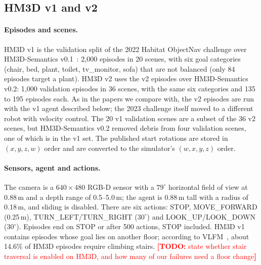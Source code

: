 \documentclass[10pt]{article}
\newcommand{\TODO}[1]{\textcolor{red}{\textbf{[TODO:} #1\textbf{]}}}
\begin{document}
\subsection{HM3D v1 and v2}\label{app:protocols-hm3d}

\paragraph{Episodes and scenes.} HM3D v1 is the validation split of the 2022 Habitat ObjectNav challenge over HM3D-Semantics v0.1~\citep{ramakrishnan2021habitat,yadav2023habitat}: 2{,}000 episodes in 20 scenes, with six goal categories (chair, bed, plant, toilet, tv\_monitor, sofa) that are not balanced (only 84 episodes target a plant). HM3D v2 uses the v2 episodes over HM3D-Semantics v0.2: 1{,}000 validation episodes in 36 scenes, with the same six categories and 135 to 195 episodes each. As in the papers we compare with, the v2 episodes are run with the v1 agent described below; the 2023 challenge itself moved to a different robot with velocity control. The 20 v1 validation scenes are a subset of the 36 v2 scenes, but HM3D-Semantics v0.2 removed debris from four validation scenes, one of which is in the v1 set. The published start rotations are stored in $(x,y,z,w)$ order and are converted to the simulator's $(w,x,y,z)$ order.

\paragraph{Sensors, agent and actions.} The camera is a $640 \times 480$ RGB-D sensor with a $79^\circ$ horizontal field of view at 0.88\,m and a depth range of 0.5--5.0\,m; the agent is 0.88\,m tall with a radius of 0.18\,m, and sliding is disabled. There are six actions: STOP, MOVE\_FORWARD (0.25\,m), TURN\_LEFT/TURN\_RIGHT ($30^\circ$) and LOOK\_UP/LOOK\_DOWN ($30^\circ$). Episodes end on STOP or after 500 actions, STOP included. HM3D v1 contains episodes whose goal lies on another floor; according to VLFM~\citep{yokoyama2024vlfm}, about 14.6\% of HM3D episodes require climbing stairs. \TODO{state whether stair traversal is enabled on HM3D, and how many of our failures need a floor change}
\end{document}
